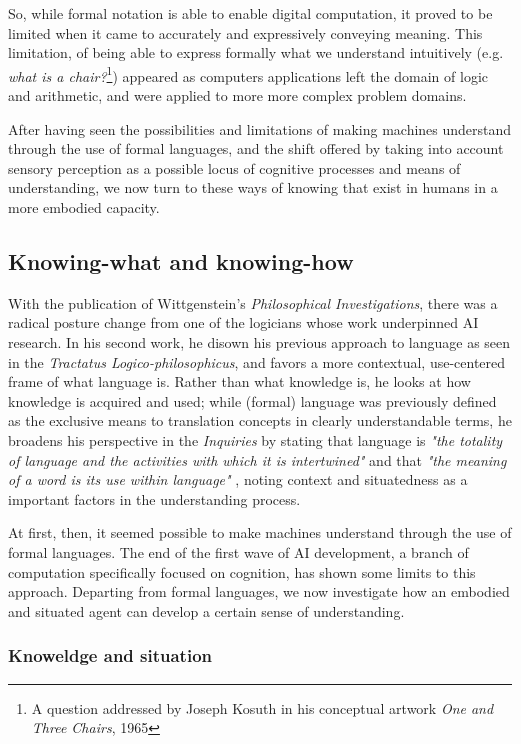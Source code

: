 So, while formal notation is able to enable digital computation, it proved to be limited when it came to accurately and expressively  conveying meaning. This limitation, of being able to express formally what we understand intuitively (e.g. \emph{what is a chair?}\footnote{A question addressed by Joseph Kosuth in his conceptual artwork \emph{One and Three Chairs}, 1965}) appeared as computers applications left the domain of logic and arithmetic, and were applied to more more complex problem domains. 

After having seen the possibilities and limitations of making machines understand through the use of formal languages, and the shift offered by taking into account sensory perception as a possible locus of cognitive processes and means of understanding, we now turn to these ways of knowing that exist in humans in a more embodied capacity.

\subsection{Knowing-what and knowing-how}
\label{subsec:knowing-what-how}

With the publication of Wittgenstein's \emph{Philosophical Investigations}, there was a radical posture change from one of the logicians whose work underpinned AI research. In his second work, he disown his previous approach to language as seen in the \emph{Tractatus Logico-philosophicus}, and favors a more contextual, use-centered frame of what language is. Rather than what knowledge is, he looks at how knowledge is acquired and used; while (formal) language was previously defined as the exclusive means to translation concepts in clearly understandable terms, he broadens his perspective in the \emph{Inquiries} by stating that language is \emph{"the totality of language and the activities with which it is intertwined"} and that \emph{"the meaning of a word is its use within language"} \citep{wittgenstein_recherches_2004}, noting context and situatedness as a important factors in the understanding process.

At first, then, it seemed possible to make machines understand through the use of formal languages. The end of the first wave of AI development, a branch of computation specifically focused on cognition, has shown some limits to this approach. Departing from formal languages, we now investigate how an embodied and situated agent can develop a certain sense of understanding.

\subsubsection{Knoweldge and situation}
\label{subsubsec:knowledge-situation}

